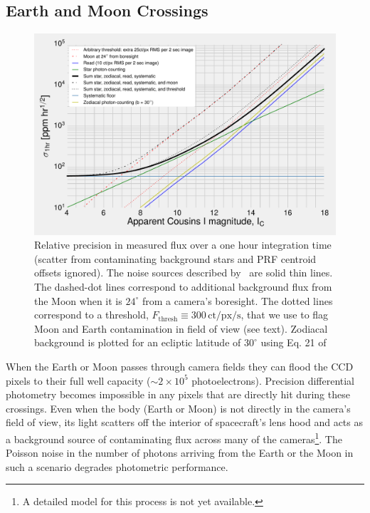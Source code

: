 \subsection{Earth and Moon Crossings}
\label{sec:earth_moon_crossings}
\begin{figure}[!tb]
	\centering
	\includegraphics{figures/precision_memo.pdf}
	\caption{Relative precision in measured flux over a one hour integration 
	time (scatter from contaminating background stars and PRF centroid offsets 
	ignored). The noise sources described by~\protect\citet{Sullivan_2015} are 
	solid thin lines.
	The dashed-dot lines correspond to additional background flux from the Moon 
	when it is $24^\circ$ from a camera's boresight.	
	The dotted lines correspond to a threshold, $F_\mathrm{thresh}\equiv 
	300\,\mathrm{ct/px/s}$, that we use to flag Moon and Earth contamination in 
	\tesss field of view (see text).
	Zodiacal background is plotted for an ecliptic latitude of $30^\circ$ using 
	Eq. 21 of~\protect\citet{Sullivan_2015}}
	\label{fig:noise_with_moon}
\end{figure}

When the Earth or Moon passes through \tesss camera fields they can
flood the CCD pixels to their full well capacity ($\sim2\times10^5$
photoelectrons).  Precision differential photometry becomes impossible
in any pixels that are directly hit during these crossings.  Even when
the body (Earth or Moon) is not directly in the camera's field of
view, its light scatters off the interior of spacecraft's lens hood
and acts as a background source of contaminating flux across many of
the cameras\footnote{A detailed model for this process is not yet
  available.}.  
The Poisson noise in the number of photons
arriving from the Earth or the Moon in such a scenario degrades \tesss
photometric performance.   

